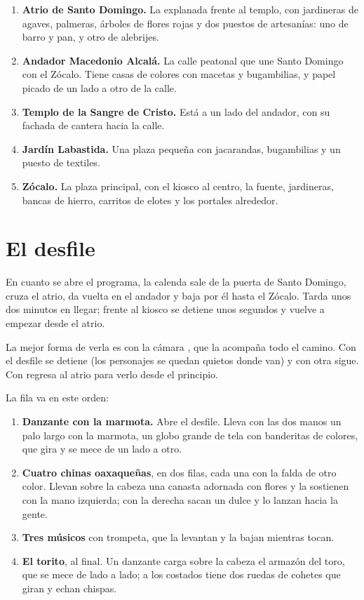 \documentclass[11pt,a4paper]{article}
\begin{document}
\begin{enumerate}
  \item \textbf{Atrio de Santo Domingo.} La explanada frente al templo, con jardineras de agaves, palmeras, árboles de flores rojas y dos puestos de artesanías: uno de barro y pan, y otro de alebrijes.
  \item \textbf{Andador Macedonio Alcalá.} La calle peatonal que une Santo Domingo con el Zócalo. Tiene casas de colores con macetas y bugambilias, y papel picado de un lado a otro de la calle.
  \item \textbf{Templo de la Sangre de Cristo.} Está a un lado del andador, con su fachada de cantera hacia la calle.
  \item \textbf{Jardín Labastida.} Una plaza pequeña con jacarandas, bugambilias y un puesto de textiles.
  \item \textbf{Zócalo.} La plaza principal, con el kiosco al centro, la fuente, jardineras, bancas de hierro, carritos de elotes y los portales alrededor.
\end{enumerate}

\section{El desfile}

En cuanto se abre el programa, la calenda sale de la puerta de Santo Domingo, cruza el atrio, da vuelta en el andador y baja por él hasta el Zócalo. Tarda unos dos minutos en llegar; frente al kiosco se detiene unos segundos y vuelve a empezar desde el atrio.

La mejor forma de verla es con la cámara , que la acompaña todo el camino. Con  el desfile se detiene (los personajes se quedan quietos donde van) y con otra  sigue. Con  regresa al atrio para verlo desde el principio.


La fila va en este orden:

\begin{enumerate}
  \item \textbf{Danzante con la marmota.} Abre el desfile. Lleva con las dos manos un palo largo con la marmota, un globo grande de tela con banderitas de colores, que gira y se mece de un lado a otro.
  \item \textbf{Cuatro chinas oaxaqueñas}, en dos filas, cada una con la falda de otro color. Llevan sobre la cabeza una canasta adornada con flores y la sostienen con la mano izquierda; con la derecha sacan un dulce y lo lanzan hacia la gente.
  \item \textbf{Tres músicos} con trompeta, que la levantan y la bajan mientras tocan.
  \item \textbf{El torito}, al final. Un danzante carga sobre la cabeza el armazón del toro, que se mece de lado a lado; a los costados tiene dos ruedas de cohetes que giran y echan chispas.
\end{enumerate}
\end{document}
